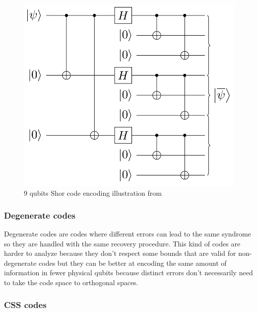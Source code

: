 \documentclass{article}
\begin{document}
\begin{figure}[H]
	\begin{center}
		\includegraphics[scale = 0.25]{shor-code-encode.png}
	\end{center}
	\caption{9 qubits Shor code encoding illustration from \cite{prefetch_repetition_code}}\label{9sc}
\end{figure}


\subsubsection{Degenerate codes}

Degenerate codes are codes where different errors can lead to the same syndrome
so they are handled with the same recovery procedure.
This kind of codes are harder to analyze because they don't respect some bounds that are
valid for non-degenerate codes but they can be better at encoding the same amount of
information in fewer physical qubits because distinct errors don't necessarily need
to take the code space to orthogonal spaces.
\subsubsection{CSS codes}
\end{document}
